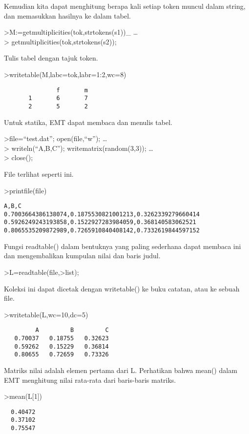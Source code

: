 \documentclass[
]{book}
\begin{document}
Kemudian kita dapat menghitung berapa kali setiap token muncul dalam string, dan memasukkan hasilnya ke dalam tabel.

\textgreater M:=getmultiplicities(tok,strtokens(s1))\_ \ldots{}\\
\textgreater{} getmultiplicities(tok,strtokens(s2));

Tulis tabel dengan tajuk token.

\textgreater writetable(M,labc=tok,labr=1:2,wc=8)

\begin{verbatim}
               f       m
       1       6       7
       2       5       2
\end{verbatim}

Untuk statika, EMT dapat membaca dan menulis tabel.

\textgreater file=``test.dat''; open(file,``w''); \ldots{}\\
\textgreater{} writeln(``A,B,C''); writematrix(random(3,3)); \ldots{}\\
\textgreater{} close();

File terlihat seperti ini.

\textgreater printfile(file)

\begin{verbatim}
A,B,C
0.7003664386138074,0.1875530821001213,0.3262339279660414
0.5926249243193858,0.1522927283984059,0.368140583062521
0.8065535209872989,0.7265910840408142,0.7332619844597152
\end{verbatim}

Fungsi readtable() dalam bentuknya yang paling sederhana dapat membaca ini dan mengembalikan kumpulan nilai dan baris judul.

\textgreater L=readtable(file,\textgreater list);

Koleksi ini dapat dicetak dengan writetable() ke buku catatan, atau ke sebuah file.

\textgreater writetable(L,wc=10,dc=5)

\begin{verbatim}
         A         B         C
   0.70037   0.18755   0.32623
   0.59262   0.15229   0.36814
   0.80655   0.72659   0.73326
\end{verbatim}

Matriks nilai adalah elemen pertama dari L. Perhatikan bahwa mean() dalam EMT menghitung nilai rata-rata dari baris-baris matriks.

\textgreater mean(L{[}1{]})

\begin{verbatim}
  0.40472 
  0.37102 
  0.75547 
\end{verbatim}
\end{document}
